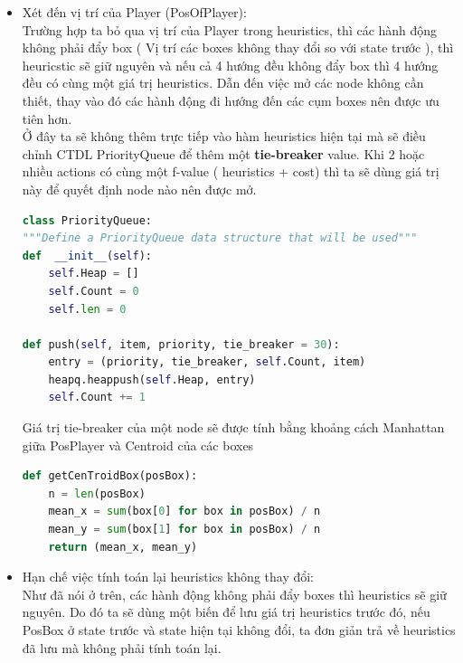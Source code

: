 \documentclass[12pt]{article}
\begin{document}
\begin{itemize}
	\item Xét đến vị trí của Player (PosOfPlayer): \\
	Trường hợp ta bỏ qua vị trí của Player trong heuristics, thì các hành động không phải đẩy box ( Vị trí các boxes không thay đổi so với state trước ), thì heuricstic sẽ giữ nguyên và nếu cả 4 hướng đều không đẩy box thì 4 hướng đều có cùng một giá trị heuristics. Dẫn đến việc mở các node không cần thiết, thay vào đó các hành động đi hướng đến các cụm boxes nên được ưu tiên hơn. \\

	Ở đây ta sẽ không thêm trực tiếp vào hàm heuristics hiện tại mà sẽ điều chỉnh CTDL PriorityQueue để thêm một \textbf{tie-breaker} value. Khi 2 hoặc nhiều actions có cùng một f-value ( heuristics + cost) thì ta sẽ dùng giá trị này để quyết định node nào nên được mở.

	\begin{tcolorbox}[boxrule=0.5pt, colback=white]
		\begin{lstlisting}[language=python, numbers=none, basicstyle=\ttfamily\footnotesize]
class PriorityQueue:
"""Define a PriorityQueue data structure that will be used"""
def  __init__(self):
	self.Heap = []
	self.Count = 0
	self.len = 0

def push(self, item, priority, tie_breaker = 30):
	entry = (priority, tie_breaker, self.Count, item)
	heapq.heappush(self.Heap, entry)
	self.Count += 1
		\end{lstlisting}
	\end{tcolorbox}

	Giá trị tie-breaker của một node sẽ được tính bằng khoảng cách Manhattan giữa PosPlayer và Centroid của các boxes
	\begin{tcolorbox}[boxrule=0.5pt, colback=white]
		\begin{lstlisting}[language=python, numbers=none, basicstyle=\ttfamily\footnotesize]
def getCenTroidBox(posBox):
	n = len(posBox)
	mean_x = sum(box[0] for box in posBox) / n
	mean_y = sum(box[1] for box in posBox) / n
	return (mean_x, mean_y)
		\end{lstlisting}
	\end{tcolorbox}

	\item Hạn chế việc tính toán lại heuristics không thay đổi: \\
	Như đã nói ở trên, các hành động không phải đẩy boxes thì heuristics sẽ giữ nguyên. Do đó ta sẽ dùng một biến để lưu giá trị heuristics trước đó, nếu PosBox ở state trước và state hiện tại không đổi, ta đơn giản trả về heuristics đã lưu mà không phải tính toán lại.
	

\end{itemize}
\end{document}
